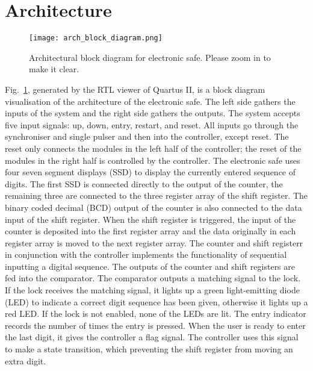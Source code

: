 \section{Architecture}

\begin{figure}[htbp]
   \centerline{
   \texttt{[image: arch\_block\_diagram.png]}}
   \caption{Architectural block diagram for electronic safe. Please zoom in to make it clear.}
   \label{fig:arch_block_diagram}
\end{figure}

Fig.~\ref{fig:arch_block_diagram}, generated by the RTL viewer of Quartus II, is a block diagram visualisation of the architecture of the electronic safe. The left side gathers the inputs of the system and the right side gathers the outputs. The system accepts five input signals: up, down, entry, restart, and reset. All inputs go through the synchroniser and single pulser and then into the controller, except reset. The reset only connects the modules in the left half of the controller; the reset of the modules in the right half is controlled by the controller. The electronic safe uses four seven segment displays (SSD) to display the currently entered sequence of digits. The first SSD is connected directly to the output of the counter, the remaining three are connected to the three register array of the shift register. The binary coded decimal (BCD) output of the counter is also connected to the data input of the shift register. When the shift register is triggered, the input of the counter is deposited into the first register array and the data originally in each register array is moved to the next register array. The counter and shift registerr in conjunction with the controller implements the functionality of sequential inputting a digital sequence. The outputs of the counter and shift registers are fed into the comparator. The comparator outputs a matching signal to the lock. If the lock receives the matching signal, it lights up a green light-emitting diode (LED) to indicate a correct digit sequence has been given, otherwise it lights up a red LED. If the lock is not enabled, none of the LEDs are lit. The entry indicator records the number of times the entry is pressed. When the user is ready to enter the last digit, it gives the controller a flag signal. The controller uses this signal to make a state transition, which preventing the shift register from moving an extra digit.
